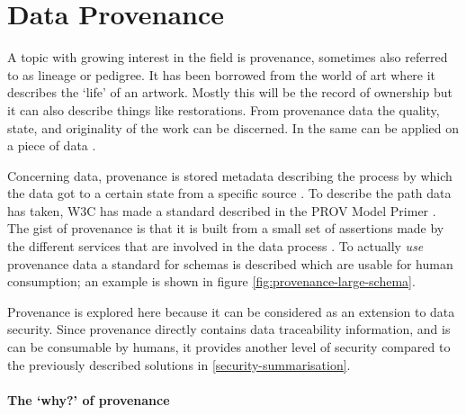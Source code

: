 \newcommand{\agent}{{\tt agent}}
\newcommand{\entity}{{\tt entity}}
\newcommand{\activity}{{\tt activity}}
\newcommand{\relation}{{\tt relation}}
\newcommand{\relations}{{\tt relations}}
\newcommand{\attributes}{{\tt attributes}}

\section{Data Provenance}
\label{datamodel-provenance}

A topic with growing interest in the \escience{} field is provenance, sometimes also referred to as lineage or pedigree.
It has been borrowed from the world of art where it describes the `life' of an artwork.
Mostly this will be the record of ownership but it can also describe things like restorations.
From provenance data the quality, state, and originality of the work can be discerned.
In \escience{} the same can be applied on a piece of data \cite{dsp4moreau}.

Concerning data, provenance is stored metadata describing the process by which the data got to a certain state from a specific source \cite{dsp4moreau,dsp2buneman}.
To describe the path data has taken, W3C  has made a standard described in the PROV Model Primer \cite{dsp8gil}.
The gist of provenance is that it is built from a small set of assertions made by the different services that are involved in  the data process \cite{dsp4moreau}.
To actually \emph{use} provenance data a standard for schemas is described which are usable for human consumption; an example is shown in figure \ref{fig:provenance-large-schema}.

Provenance is explored here because it can be considered as an extension to data security.
Since provenance directly contains data traceability information, and is can be consumable by humans, it provides another level of security compared to the previously described solutions in \ref{security-summarisation}.


\paragraph{The `why?' of provenance}
\label{provenance-why}

